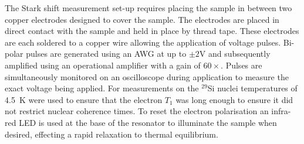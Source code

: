 The Stark shift measurement set-up requires placing the sample in between two copper electrodes designed to cover the sample.
The electrodes are placed in direct contact with the sample and held in place by thread tape.
These electrodes are each soldered to a copper wire allowing the application of voltage pulses.
Bi-polar pulses are generated using an AWG at up to $\pm2$V and subsequently amplified using an operational amplifier with a gain of $60\times$.
Pulses are simultaneously monitored on an oscilloscope during application to measure the exact voltage being applied.
For measurements on the $^{29}$Si nuclei temperatures of 4.5~K were used to ensure that the electron $T_1$ was long enough to ensure it did not restrict nuclear coherence times.
To reset the electron polarisation an infra-red LED is used at the base of the resonator to illuminate the sample when desired, effecting a rapid relaxation to thermal equilibrium.
